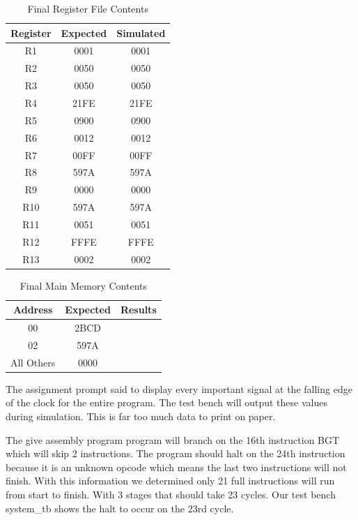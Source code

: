 	\begin{table}[htbp]
		   \caption{Final Register File Contents}
		   \label{results}
		   \centering
		   \begin{tabular}{ c | c | c}
		   Register         & Expected & Simulated   \\
		   \hline
		   R1  &   0001     &   0001        \\
	       R2  &   0050     &   0050        \\
	       R3  &   0050     &   0050        \\
	       R4  &   21FE     &   21FE        \\
	       R5  &   0900     &   0900        \\
	       R6  &   0012     &   0012        \\
	       R7  &   00FF     &   00FF        \\
	       R8  &   597A     &   597A        \\
	       R9  &   0000     &   0000        \\
	       R10 &   597A     &   597A        \\
	       R11 &   0051     &   0051        \\
	       R12 &   FFFE     &   FFFE        \\
	       R13 &   0002     &   0002        \\
		   \end{tabular}
		\end{table}
	    \begin{table}[htbp]
	       \caption{Final Main Memory Contents}
	       \label{fmainme}
	       \centering
	       \begin{tabular}{ c | c | c }
	       Address         & Expected & Results    \\
	       \hline
	       00  &   2BCD            \\
           02  &   597A            \\
	       All Others  &   0000    \\
	       
	       \end{tabular}
	    \end{table}
	    The assignment prompt said to display every important signal at the falling
	    edge of the clock for the entire program. The test bench will output these values
	    during simulation. This is far too much data to print on paper.
	     
	    The give assembly program program will branch on the 16th instruction BGT which will skip 2 instructions. The program should halt on the 24th instruction because it is an unknown
	    opcode which means the last two instructions will not finish.
	    With this information we determined only 21 full instructions will run from start to finish. With 3 stages that should take 23 cycles.
	    Our test bench system\_tb shows the halt to occur on the 23rd cycle. 


